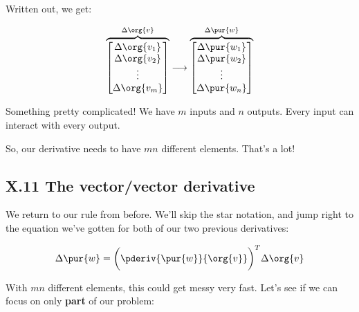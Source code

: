         Written out, we get:
        
        \begin{equation}
            \overbrace{
                \begin{bmatrix}
                    \Delta \org{v_1}\\ \Delta \org{v_2}\\ \vdots \\ \Delta \org{v_m}
                \end{bmatrix}
            }^{\Delta \org{v}}
            \longrightarrow 
            \overbrace{
                \begin{bmatrix}
                    \Delta \pur{w_1}\\ \Delta \pur{w_2}\\ \vdots \\ \Delta \pur{w_n}
                \end{bmatrix}
            }^{\Delta \pur{w}}
        \end{equation}
        
        Something pretty complicated! We have $m$ inputs and $n$ outputs. Every input can interact with every output.
        
        So, our derivative needs to have $mn$ different elements. That's a lot!
    
    \secdiv
    
    \subsection*{X.11 \quad The vector/vector derivative}  
    
        We return to our rule from before. We'll skip the star notation, and jump right to the equation we've gotten for both of our two previous derivatives:
        
        \begin{equation}
            \Delta \pur{w}
            =
            \bigg(
                \pderiv{ \pur{w} }{ \org{v} } 
            \bigg)^T
            \Delta \org{v}
        \end{equation}
        
        With $mn$ different elements, this could get messy very fast. Let's see if we can focus on only \textbf{part} of our problem:
        

